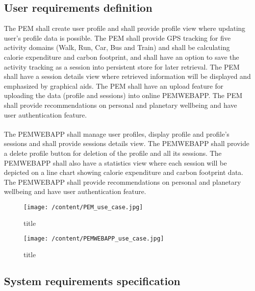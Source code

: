 \documentclass[12pt, a4paper]{report}   %
\begin{document}
\begin{enumerate}
\subsection{User requirements definition}
The PEM shall create user profile and shall provide profile view where updating user's profile data is possible. The PEM shall provide GPS tracking for five activity domains (Walk, Run, Car, Bus and Train) and shall be calculating calorie expenditure and carbon footprint, and shall have an option to save the activity tracking as a session into persistent store for later retrieval. The PEM shall have a session details view where retrieved information will be displayed and emphasized by graphical aids. The PEM shall have an upload feature for uploading the data (profile and sessions) into online PEMWEBAPP. The PEM shall provide recommendations on personal and planetary wellbeing and have user authentication feature.\\ \\
The PEMWEBAPP shall manage user profiles, display profile and profile's sessions and shall provide sessions details view. The PEMWEBAPP shall provide a delete profile button for deletion of the profile and all its sessions. The PEMWEBAPP shall also have a statistics view where each session will be depicted on a line chart showing calorie expenditure and carbon footprint data. The PEMWEBAPP shall provide recommendations on personal and planetary wellbeing and have user authentication feature.


\begin{figure}[H]
  \centering
	\texttt{[image: /content/PEM\_use\_case.jpg]}
	  \caption{title}
\end{figure}

\begin{figure}[H]
  \centering
	\texttt{[image: /content/PEMWEBAPP\_use\_case.jpg]}
	  \caption{title}
\end{figure}


\subsection{System requirements specification}

\end{enumerate}
\end{document}
